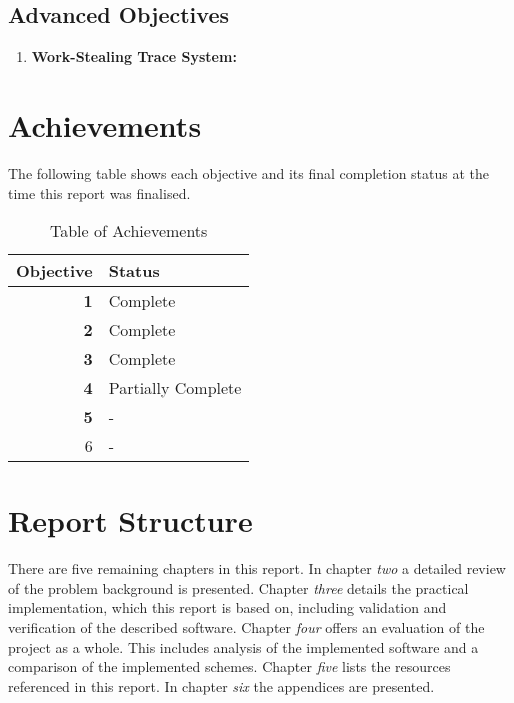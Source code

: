 \subsection*{Advanced Objectives}
\begin{enumerate}
\setcounter{enumi}{\value{saveenum}}
\item \textbf{Work-Stealing Trace System:}
\end{enumerate}

\section*{Achievements}
The following table shows each objective and its final completion status at the time this 
report was finalised. 

\begin{table}[H]
    \centering
    \begin{tabular}{|r|l|}
        \hline
            \textbf{Objective} & \textbf{Status} \\
        \hline \hline
            \textbf{1} & Complete \\
            \textbf{2} & Complete \\
            \textbf{3} & Complete \\
            \textbf{4} & Partially Complete \\
            \textbf{5} & - \\
        \hline
            6 & - \\
        \hline
    \end{tabular}
    
    \label{tab:ach}
    \caption{Table of Achievements}
\end{table}

\section*{Report Structure}

There are five remaining chapters in this report. 
In chapter \textit{two} a detailed review of the problem background is presented. 
Chapter \textit{three} details the practical implementation, which this report is based on, including validation and verification of the described software.
Chapter \textit{four} offers an evaluation of the project as a whole. This includes analysis of the implemented software and a comparison of the implemented
schemes.
Chapter \textit{five} lists the resources referenced in this report.
In chapter \textit{six} the appendices are presented.

